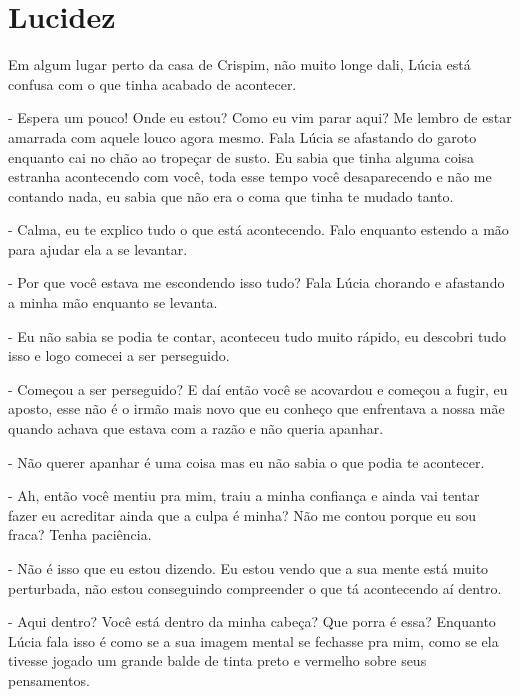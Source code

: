 
\chapter{Lucidez}

Em algum lugar perto da casa de Crispim, não muito longe dali, Lúcia está confusa com o que tinha acabado de acontecer.

- Espera um pouco! Onde eu estou? Como eu vim parar aqui? Me lembro de estar amarrada com aquele louco agora mesmo. Fala Lúcia se afastando do garoto enquanto cai no chão ao tropeçar de susto. Eu sabia que tinha alguma coisa estranha acontecendo com você, toda esse tempo você desaparecendo e não me contando nada, eu sabia que não era o coma que tinha te mudado tanto.

- Calma, eu te explico tudo o que está acontecendo. Falo enquanto estendo a mão para ajudar ela a se levantar.

- Por que você estava me escondendo isso tudo? Fala Lúcia chorando e afastando a minha mão enquanto se levanta.

- Eu não sabia se podia te contar, aconteceu tudo muito rápido, eu descobri tudo isso e logo comecei a ser perseguido.

- Começou a ser perseguido? E daí então você se acovardou e começou a fugir, eu aposto, esse não é o irmão mais novo que eu conheço que enfrentava a nossa mãe quando achava que estava com a razão e não queria apanhar.

- Não querer apanhar é uma coisa mas eu não sabia o que podia te acontecer.

- Ah, então você mentiu pra mim, traiu a minha confiança e ainda vai tentar fazer eu acreditar ainda que a culpa é minha? Não me contou porque eu sou fraca? Tenha paciência.

- Não é isso que eu estou dizendo. Eu estou vendo que a sua mente está muito perturbada, não estou conseguindo compreender o que tá acontecendo aí dentro.

- Aqui dentro? Você está dentro da minha cabeça? Que porra é essa? Enquanto Lúcia fala isso é como se a sua imagem mental se fechasse pra mim, como se ela tivesse jogado um grande balde de tinta preto e vermelho sobre seus pensamentos.

